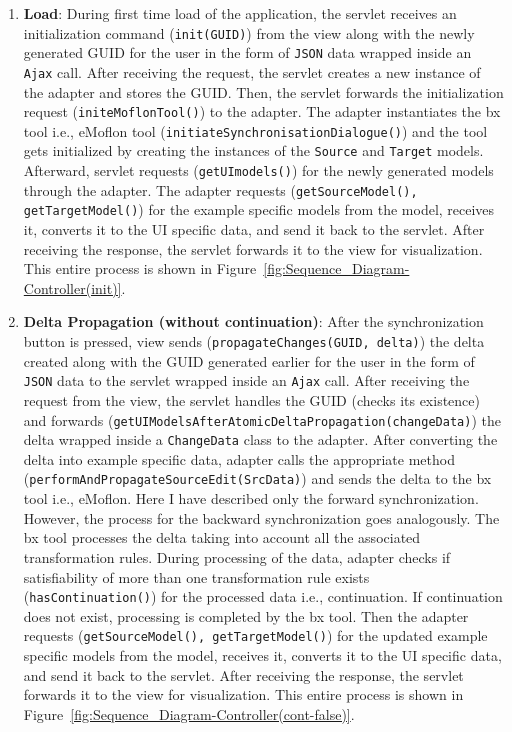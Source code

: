 \begin{enumerate}
	\item {\textbf{Load}: During first time load of the application, the servlet receives an initialization command (\texttt{init(GUID)}) from the view along with the newly generated GUID for the user in the form of \texttt{JSON} data wrapped inside an \texttt{Ajax} call. After receiving the request, the servlet creates a new instance of the adapter and stores the GUID. Then, the servlet forwards the initialization request (\texttt{initeMoflonTool()}) to the adapter. The adapter instantiates the bx tool i.e., eMoflon tool (\texttt{initiateSynchronisationDialogue()}) and the tool gets initialized by creating the instances of the \texttt{Source} and \texttt{Target} models. Afterward, servlet requests 
	(\texttt{getUImodels()}) for the newly generated models through the adapter. The adapter requests (\texttt{getSourceModel(), getTargetModel()}) for the example specific models from the model, receives it, converts it to the UI specific data, and send it back to the servlet. After receiving the response, the servlet forwards it to the view for visualization. This entire process is shown in Figure~\ref{fig:Sequence_Diagram-Controller(init)}.}
		
	\item {\textbf{Delta Propagation (without continuation)}: After the synchronization button is pressed, view sends (\texttt{propagateChanges(GUID, delta)}) the delta created along with the GUID generated earlier for the user in the form of \texttt{JSON} data to the servlet wrapped inside an \texttt{Ajax} call. After receiving the request from the view, the servlet handles the GUID (checks its existence) and forwards (\texttt{getUIModelsAfterAtomicDeltaPropagation(changeData)}) the delta wrapped inside a \texttt{ChangeData} class to the adapter. After converting the delta into example specific data, adapter calls the appropriate method (\texttt{performAndPropagateSourceEdit(SrcData)}) and sends the delta to the bx tool i.e., eMoflon. Here I have described only the forward synchronization. However, the process for the backward synchronization goes analogously. The bx tool processes the delta taking into account all the associated transformation rules. During processing of the data, adapter checks if satisfiability of more than one transformation rule exists (\texttt{hasContinuation()}) for the processed data i.e., continuation. If continuation does not exist, processing is completed by the bx tool. Then the adapter requests (\texttt{getSourceModel(), getTargetModel()}) for the updated example specific models from the model, receives it, converts it to the UI specific data, and send it back to the servlet. After receiving the response, the servlet forwards it to the view for visualization. This entire process is shown in Figure~\ref{fig:Sequence_Diagram-Controller(cont-false)}.}
	

\end{enumerate}
